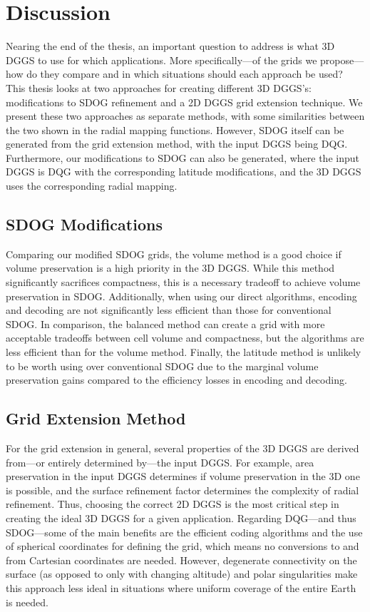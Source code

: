\chapter{Discussion} \label{chap:discussion}
Nearing the end of the thesis, an important question to address is what 3D DGGS to use for which applications.
More specifically---of the grids we propose---how do they compare and in which situations should each approach be used?
This thesis looks at two approaches for creating different 3D DGGS's: modifications to SDOG refinement and a 2D DGGS grid extension technique.
We present these two approaches as separate methods, with some similarities between the two shown in the radial mapping functions.
However, SDOG itself can be generated from the grid extension method, with the input DGGS being DQG.
Furthermore, our modifications to SDOG can also be generated, where the input DGGS is DQG with the corresponding latitude modifications, and the 3D DGGS uses the corresponding radial mapping.


\section{SDOG Modifications}
Comparing our modified SDOG grids, the volume method is a good choice if volume preservation is a high priority in the 3D DGGS.
While this method significantly sacrifices compactness, this is a necessary tradeoff to achieve volume preservation in SDOG. Additionally, when using our direct algorithms, encoding and decoding are not significantly less efficient than those for conventional SDOG.
In comparison, the balanced method can create a grid with more acceptable tradeoffs between cell volume and compactness, but the algorithms are less efficient than for the volume method.
Finally, the latitude method is unlikely to be worth using over conventional SDOG due to the marginal volume preservation gains compared to the efficiency losses in encoding and decoding.


\section{Grid Extension Method}
For the grid extension in general, several properties of the 3D DGGS are derived from---or entirely determined by---the input DGGS.
For example, area preservation in the input DGGS determines if volume preservation in the 3D one is possible, and the surface refinement factor determines the complexity of radial refinement.
Thus, choosing the correct 2D DGGS is the most critical step in creating the ideal 3D DGGS for a given application.
Regarding DQG---and thus SDOG---some of the main benefits are the efficient coding algorithms and the use of spherical coordinates for defining the grid, which means no conversions to and from Cartesian coordinates are needed.
However, degenerate connectivity on the surface (as opposed to only with changing altitude) and polar singularities make this approach less ideal in situations where uniform coverage of the entire Earth is needed.


